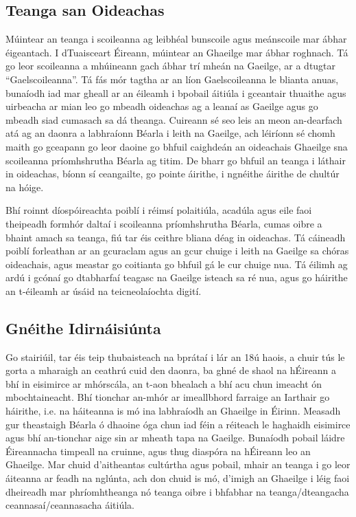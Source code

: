 \begin{multicols}{2}
\subsection{Teanga san Oideachas}

Múintear an teanga i scoileanna ag leibhéal bunscoile agus meánscoile mar ábhar éigeantach. I dTuaisceart Éireann, múintear an Ghaeilge mar ábhar roghnach. Tá go leor scoileanna a mhúineann gach ábhar trí mheán na Gaeilge, ar a dtugtar “Gaelscoileanna”. Tá fás mór tagtha ar an líon Gaelscoileanna le blianta anuas, bunaíodh iad mar gheall ar an éileamh i bpobail áitiúla i gceantair thuaithe agus uirbeacha ar mian leo go mbeadh oideachas ag a leanaí as Gaeilge agus go mbeadh siad cumasach sa dá theanga. Cuireann sé seo leis an meon an-dearfach atá ag an daonra a labhraíonn Béarla i leith na Gaeilge, ach léiríonn sé chomh maith go gceapann go leor daoine go bhfuil caighdeán an oideachais Ghaeilge sna scoileanna príomhshrutha Béarla ag titim. De bharr go bhfuil an teanga i láthair in oideachas, bíonn sí ceangailte, go pointe áirithe, i ngnéithe áirithe de chultúr na hóige. 

Bhí roinnt díospóireachta poiblí i réimsí polaitiúla, acadúla agus eile faoi theipeadh formhór daltaí i scoileanna príomhshrutha Béarla, cumas oibre a bhaint amach sa teanga, fiú tar éis ceithre bliana déag in oideachas. Tá cáineadh poiblí forleathan ar an gcuraclam agus an gcur chuige i leith na Gaeilge sa chóras oideachais, agus meastar go coitianta go bhfuil gá le cur chuige nua. Tá éilimh ag ardú i gcónaí go dtabharfaí teagasc na Gaeilge isteach sa ré nua, agus go háirithe an t-éileamh ar úsáid na teicneolaíochta digití.



\subsection{Gnéithe Idirnáisiúnta}

Go stairiúil, tar éis teip thubaisteach na bprátaí i lár an 18ú haois, a chuir tús le gorta a mharaigh an ceathrú cuid den daonra, ba ghné de shaol na hÉireann a bhí in eisimirce ar mhórscála, an t-aon bhealach a bhí acu chun imeacht ón mbochtaineacht. Bhí tionchar an-mhór ar imeallbhord farraige an Iarthair go háirithe, i.e. na háiteanna is mó ina labhraíodh an Ghaeilge in Éirinn.  Measadh gur theastaigh Béarla ó dhaoine óga chun iad féin a réiteach le haghaidh eisimirce agus bhí an-tionchar aige sin ar mheath tapa na Gaeilge. Bunaíodh pobail láidre Éireannacha timpeall na cruinne, agus thug diaspóra na hÉireann leo an Ghaeilge. Mar chuid d’aitheantas cultúrtha agus pobail, mhair an teanga i go leor áiteanna ar feadh na nglúnta, ach don chuid is mó, d’imigh an Ghaeilge i léig faoi dheireadh mar phríomhtheanga nó teanga oibre i bhfabhar na teanga/dteangacha ceannasaí/ceannasacha áitiúla. 


\end{multicols}
